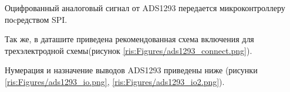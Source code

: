Оцифрованный аналоговый сигнал от ADS1293 передается микроконтроллеру поcредством \acf{SPI}.





Так же, в даташите приведена рекомендованная схема включения для трехэлектродной схемы(рисунок \ref{ris:Figures/ads1293_connect.png}).




Нумерация и назначение выводов ADS1293 приведены ниже (рисунки \ref{ris:Figures/ads1293_io.png}, \ref{ris:Figures/ads1293_io2.png}).




